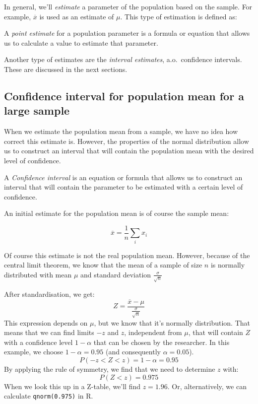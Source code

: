 In general, we'll \emph{estimate} a parameter of the population based on the sample. For example, $\overline{x}$ is used as an estimate of $\mu$. This type of estimation is defined as:

\begin{definition}
  A \emph{point estimate} for a population parameter is a formula or equation that allows us to calculate a value to estimate that parameter.
\end{definition}

Another type of estimates are the \emph{interval estimates}, a.o.~confidence intervals. These are discussed in the next sections.

\subsection{Confidence interval for population mean for a large sample}
\label{ssec:confidence-interval-pop-mean-large-sample}

When we estimate the population mean from a sample, we have no idea how correct this estimate is. However, the properties of the normal distribution allow us to construct an interval that will contain the population mean with the desired level of confidence.

\begin{definition}
  A \emph{Confidence interval} is an equation or formula that allows us to construct an interval that will contain the parameter to be estimated with a certain level of confidence.
\end{definition}

An initial estimate for the population mean is of course the sample mean:

\[ \overline{x} = \frac{1}{n} \sum_{i} x_{i} \]

Of course this estimate is not the real population mean. However, because of the central limit theorem, we know that the mean of a sample of size $n$ is normally distributed with mean $\mu$ and standard deviation $\frac{\sigma}{\sqrt{n}}$

After standardisation, we get:
\[ Z = \frac{\overline{x} - \mu}{\frac{\sigma}{\sqrt{n}}} \]
This expression depends on $\mu$, but we know that it's normally distribution. That means that we can find limits $-z$ and $z$, independent from $\mu$, that will contain $Z$ with a confidence level $1 - \alpha$ that can be chosen by the researcher. In this example, we choose $1 - \alpha= 0.95$ (and consequently $\alpha = 0.05$).
\[P(-z < Z < z) = 1 - \alpha = 0.95 \]
By applying the rule of symmetry, we find that we need to determine $z$ with:
\[ P( Z < z) = 0.975 \]
When we look this up in a Z-table, we'll find $z = 1.96$. Or, alternatively, we can calculate \verb|qnorm(0.975)| in R.

